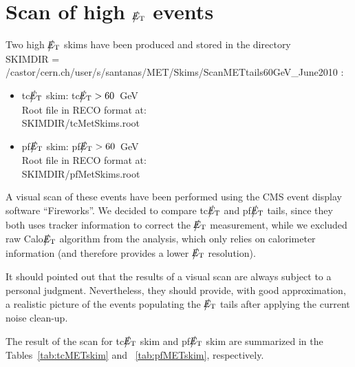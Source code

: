 \section{Scan of high $\big\slash\hspace{-1.6ex}{E_\text{T}}$ events}

Two high $\big\slash\hspace{-1.6ex}{E_\text{T}}$ skims have been produced and stored in the directory \\ 
SKIMDIR = /castor/cern.ch/user/s/santanas/MET/Skims/ScanMETtails60GeV\_June2010 :
\begin{itemize}
\item tc$\big\slash\hspace{-1.6ex}{E_\text{T}}$ skim: tc$\big\slash\hspace{-1.6ex}{E_\text{T}}>60$~GeV \\ 
Root file in RECO format at: \\ SKIMDIR/tcMetSkims.root
\item pf$\big\slash\hspace{-1.6ex}{E_\text{T}}$ skim: pf$\big\slash\hspace{-1.6ex}{E_\text{T}}>60$~GeV \\
Root file in RECO format at: \\ SKIMDIR/pfMetSkims.root
\end{itemize}

A visual scan of these events have been performed using the CMS event display
software ``Fireworks''. We decided to compare tc$\big\slash\hspace{-1.6ex}{E_\text{T}}$ and pf$\big\slash\hspace{-1.6ex}{E_\text{T}}$ 
tails, since they both uses tracker information to correct the $\big\slash\hspace{-1.6ex}{E_\text{T}}$ 
measurement, while we excluded raw Calo$\big\slash\hspace{-1.6ex}{E_\text{T}}$ algorithm from the analysis, which only relies 
on calorimeter information (and therefore provides a lower $\big\slash\hspace{-1.6ex}{E_\text{T}}$ resolution).

It should pointed out that the results of a visual scan 
are always subject to a personal judgment. 
Nevertheless, they should provide, with good approximation, a realistic 
picture of the events populating the $\big\slash\hspace{-1.6ex}{E_\text{T}}$ tails after applying 
the current noise clean-up. 

The result of the scan for tc$\big\slash\hspace{-1.6ex}{E_\text{T}}$ skim and pf$\big\slash\hspace{-1.6ex}{E_\text{T}}$ skim are summarized 
in the Tables~\ref{tab:tcMETskim} and ~\ref{tab:pfMETskim}, respectively.

